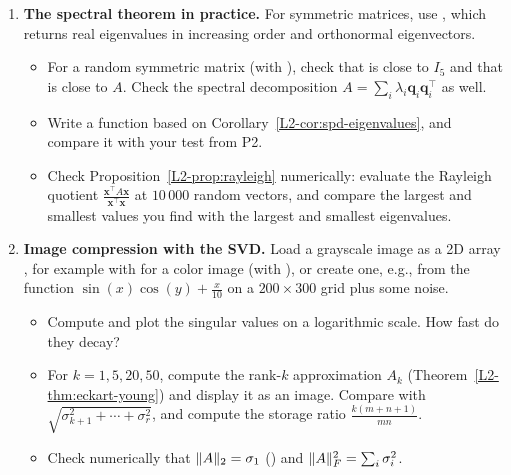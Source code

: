 \begin{enumerate}[label=\textbf{P\arabic*.}, leftmargin=*]
    \item \textbf{The spectral theorem in practice.} For symmetric matrices, use , which returns real eigenvalues in increasing order and orthonormal eigenvectors.
    \begin{itemize}
        \item For a random symmetric matrix  (with ), check that  is close to $I_5$ and that  is close to $A$. Check the spectral decomposition $A = \sum_i \lambda_i \mathbf{q}_i \mathbf{q}_i^\top$ as well.
        \item Write a function  based on Corollary~\ref{L2-cor:spd-eigenvalues}, and compare it with your test from P2.
        \item Check Proposition~\ref{L2-prop:rayleigh} numerically: evaluate the Rayleigh quotient $\frac{\mathbf{x}^\top A \mathbf{x}}{\mathbf{x}^\top \mathbf{x}}$ at $10\,000$ random vectors, and compare the largest and smallest values you find with the largest and smallest eigenvalues.
    \end{itemize}

    \item \homework{} \textbf{Image compression with the SVD.} Load a grayscale image as a 2D array , for example with  for a color image (with ), or create one, e.g., from the function $\sin(x)\cos(y) + \frac{x}{10}$ on a $200 \times 300$ grid plus some noise.
    \begin{itemize}
        \item Compute  and plot the singular values on a logarithmic scale. How fast do they decay?
        \item For $k = 1, 5, 20, 50$, compute the rank-$k$ approximation $A_k$ (Theorem~\ref{L2-thm:eckart-young}) and display it as an image. Compare  with $\sqrt{\sigma_{k+1}^2 + \cdots + \sigma_r^2}$, and compute the storage ratio $\frac{k(m + n + 1)}{mn}$.
        \item Check numerically that $\lVert A \rVert_2 = \sigma_1$ () and $\lVert A \rVert_F^2 = \sum_i \sigma_i^2$.
    \end{itemize}


\end{enumerate}
